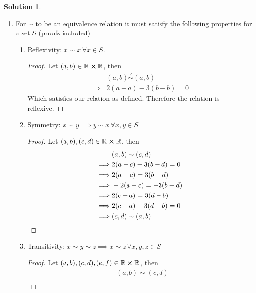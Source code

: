 \documentclass[10pt]{article}
\theoremstyle{definition}
\newtheorem{soln}{Solution}
\begin{document}
\begin{soln}
  \begin{enumerate}[label=(\alph*)]
    \item For $\sim$ to be an equivalence relation it must satisfy the following properties for a set $S$ (proofs included)
          \begin{enumerate}[label=(\roman*)]
            \item Reflexivity: $x\sim x\,\forall x\in S$.
                  \begin{proof}
                    Let $(a,b)\in\mathbb{R}\cross\mathbb{R}$, then
                    \begin{align*}
                               & (a,b)\stackrel{?}{\sim}(a,b) \\
                      \implies & 2(a-a)-3(b-b) = 0
                    \end{align*}
                    Which satisfies our relation as defined. Therefore the relation is reflexive. \qedhere
                  \end{proof}
            \item Symmetry: $x\sim y\implies  y\sim x\,\forall x,y\in S$
                  \begin{proof}
                    Let $(a,b), (c,d)\in\mathbb{R}\cross\mathbb{R}$, then
                    \begin{align*}
                               & (a,b)\sim(c,d)          \\
                      \implies & 2(a-c)-3(b-d) = 0       \\
                      \implies & 2(a-c) = 3(b-d)         \\
                      \implies & -2(a-c) = -3(b-d)       \\
                      \implies & 2(c-a) = 3(d-b)         \\
                      \implies & 2(c-a)-3(d-b) =0        \\
                      \implies & (c,d)\sim(a,b) \qedhere
                    \end{align*}
                  \end{proof}
            \item Transitivity: $x\sim y\sim z\implies  x\sim z\,\forall x,y,z\in S$
                  \begin{proof}
                    Let $(a,b), (c,d), (e,f)\in\mathbb{R}\cross\mathbb{R}$, then
                    \begin{align*}
                               & (a,b)\sim(c,d)    \\

\end{align*}
\end{proof}
\end{enumerate}
\end{enumerate}
\end{soln}
\end{document}

